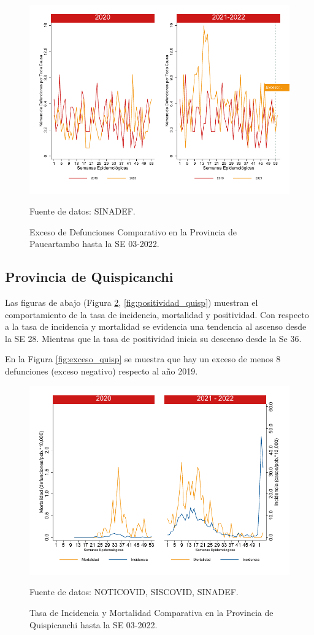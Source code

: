 \documentclass[12pt,a4paper,openany]{book}
\begin{document}
		\begin{figure}[h]
			\caption{Exceso de Defunciones Comparativo en la Provincia de Paucartambo hasta la SE 03-2022.}\label{fig:exceso_paucartam}
			\begin{center}
				\includegraphics[width=0.7\linewidth]{../figuras/exceso_11}
			\end{center}
			{\footnotesize {Fuente de datos: SINADEF.}}
		\end{figure}
		
		\clearpage
		
		\subsection*{Provincia de Quispicanchi}
		\noindent Las figuras de abajo (Figura \ref{fig:inc_mort_quisp}, \ref{fig:positividad_quisp}) muestran el comportamiento de la tasa de incidencia, mortalidad y  positividad. Con respecto a la tasa de incidencia y mortalidad se evidencia una tendencia al ascenso desde la SE 28. Mientras que la tasa de positividad inicia su descenso desde la Se 36.   

		
	En la Figura \ref{fig:exceso_quisp} se muestra que hay un exceso de menos 8 defunciones (exceso negativo) respecto al año 2019.
		
		\begin{figure}[h]
			\caption{Tasa de Incidencia y Mortalidad Comparativa en la Provincia de Quispicanchi hasta la SE 03-2022.}\label{fig:inc_mort_quisp}
			\begin{center}
				\includegraphics[width=0.7\linewidth]{../figuras/incidencia_mortalidad_20_21_12}
			\end{center}
			{\footnotesize {Fuente de datos: NOTICOVID, SISCOVID, SINADEF.}}
		\end{figure}
		
\end{document}
